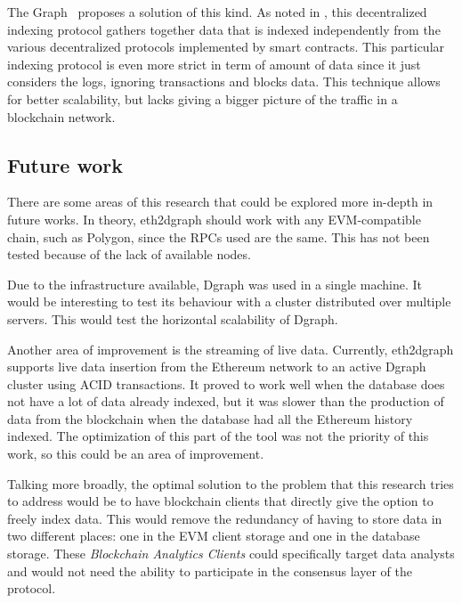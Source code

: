 The Graph~\cite{the-graph} proposes a solution of this kind. As noted in , this decentralized indexing protocol gathers together data that is indexed independently from the various decentralized protocols implemented by smart contracts. This particular indexing protocol is even more strict in term of amount of data since it just considers the logs, ignoring transactions and blocks data. This technique allows for better scalability, but lacks giving a bigger picture of the traffic in a blockchain network.

\subsection{Future work}

There are some areas of this research that could be explored more in-depth in future works. In theory, eth2dgraph should work with any EVM-compatible chain, such as Polygon, since the RPCs used are the same. This has not been tested because of the lack of available nodes.

Due to the infrastructure available, Dgraph was used in a single machine. It would be interesting to test its behaviour with a cluster distributed over multiple servers. This would test the horizontal scalability of Dgraph.

Another area of improvement is the streaming of live data. Currently, eth2dgraph supports live data insertion from the Ethereum network to an active Dgraph cluster using ACID transactions. It proved to work well when the database does not have a lot of data already indexed, but it was slower than the production of data from the blockchain when the database had all the Ethereum history indexed. The optimization of this part of the tool was not the priority of this work, so this could be an area of improvement.

Talking more broadly, the optimal solution to the problem that this research tries to address would be to have blockchain clients that directly give the option to freely index data. This would remove the redundancy of having to store data in two different places: one in the EVM client storage and one in the database storage. These \textit{Blockchain Analytics Clients} could specifically target data analysts and would not need the ability to participate in the consensus layer of the protocol. 


